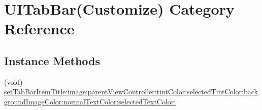 \hypertarget{category_u_i_tab_bar_07_customize_08}{\section{U\+I\+Tab\+Bar(Customize) Category Reference}
\label{category_u_i_tab_bar_07_customize_08}
}
\subsection*{Instance Methods}
\begin{DoxyCompactItemize}
\item 
(void) -\/ \hyperlink{category_u_i_tab_bar_07_customize_08_a94cb37e9c9a1688b281069c578804ef3}{set\+Tab\+Bar\+Item\+Title\+:image\+:parent\+View\+Controller\+:tint\+Color\+:selected\+Tint\+Color\+:background\+Image\+Color\+:normal\+Text\+Color\+:selected\+Text\+Color\+:}
\end{DoxyCompactItemize}


